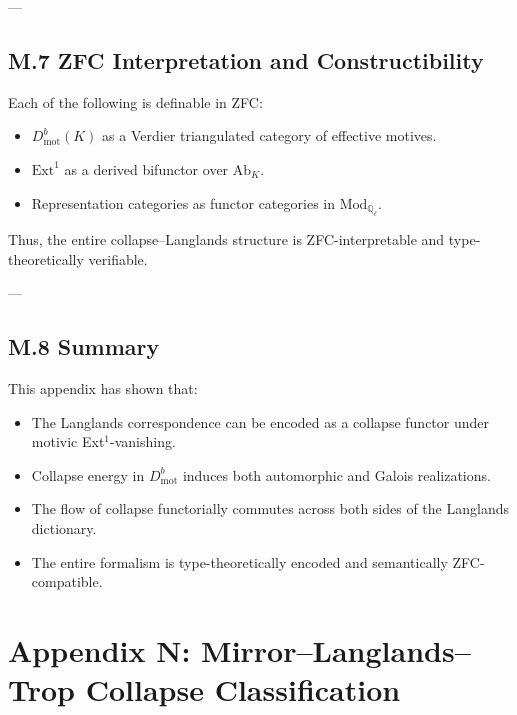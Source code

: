 \documentclass[11pt]{article}
\begin{document}
---

\subsection*{M.7 ZFC Interpretation and Constructibility}

Each of the following is definable in ZFC:
\begin{itemize}
  \item $D^b_{\mathrm{mot}}(K)$ as a Verdier triangulated category of effective motives.
  \item $\mathrm{Ext}^1$ as a derived bifunctor over $\text{Ab}_K$.
  \item Representation categories as functor categories in $\text{Mod}_{\mathbb{Q}_\ell}$.
\end{itemize}

Thus, the entire collapse–Langlands structure is ZFC-interpretable and type-theoretically verifiable.

---

\subsection*{M.8 Summary}

This appendix has shown that:
\begin{itemize}
  \item The Langlands correspondence can be encoded as a collapse functor under motivic Ext$^1$-vanishing.
  \item Collapse energy in $D^b_{\mathrm{mot}}$ induces both automorphic and Galois realizations.
  \item The flow of collapse functorially commutes across both sides of the Langlands dictionary.
  \item The entire formalism is type-theoretically encoded and semantically ZFC-compatible.
\end{itemize}




\section*{Appendix N: Mirror–Langlands–Trop Collapse Classification}
\end{document}
